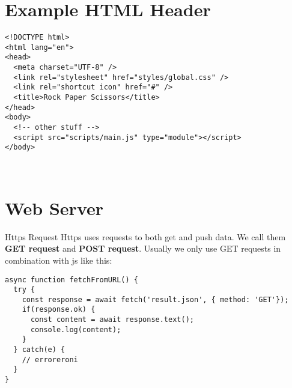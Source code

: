 \documentclass[main.tex,fontsize=6pt,paper=a4,paper=landscape,DIV=calc,]{scrartcl}
\begin{document}
\begin{multicols*}{4}
\section{Example HTML Header}
\begin{lstlisting}
<!DOCTYPE html>
<html lang="en">
<head>
  <meta charset="UTF-8" />
  <link rel="stylesheet" href="styles/global.css" />
  <link rel="shortcut icon" href="#" />
  <title>Rock Paper Scissors</title>
</head>
<body>
  <!-- other stuff -->
  <script src="scripts/main.js" type="module"></script>
</body>
\end{lstlisting}
\, \newline





\section{Web Server}


Https Request  
Https uses requests to both get and push data.\newline
We call them \textbf{GET request} and \textbf{POST request}.\newline
Usually we only use GET requests in combination with js like this:\newline
\begin{lstlisting}
async function fetchFromURL() {
  try {
    const response = await fetch('result.json', { method: 'GET'});
    if(response.ok) {
      const content = await response.text();
      console.log(content);
    }
  } catch(e) {
    // erroreroni
  }
}
\end{lstlisting}
\, \newline


\end{multicols*}
\end{document}
